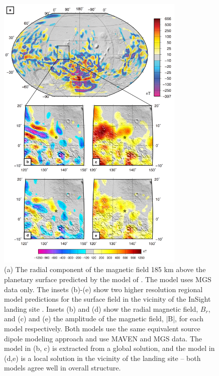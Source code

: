 \begin{figure}[h!]
\begin{center}
\includegraphics[width=0.8\textwidth]
{figures/Fig_6Sue.png}
\caption{(a) The radial component of the magnetic field 185 km above the planetary surface predicted by the model of \citep{Morschhauser2014}. The model uses MGS data only.  The insets (b)-(e) show two higher resolution regional model predictions for the surface field in the vicinity of the InSight landing site \cite{Langlais2017, Mittelholz2017}. Insets (b) and (d) show the radial magnetic field, $B_{r}$, and (c) and (e) the amplitude of the magnetic field, $\vert$B|, for each model respectively.  Both models use the same equivalent source dipole modeling approach and use MAVEN and MGS data.  The model in (b, c) is extracted from a global solution, and the model in (d,e) is a local solution in the vicinity of the landing site – both models agree well in overall structure.}
\label{fig:Magneticfield} 
\end{center}
\end{figure}

